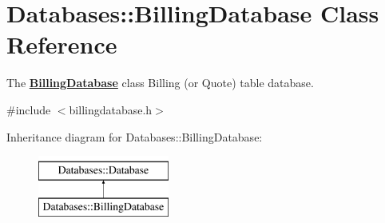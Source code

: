 \hypertarget{classDatabases_1_1BillingDatabase}{}\section{Databases\+:\+:Billing\+Database Class Reference}
\label{classDatabases_1_1BillingDatabase}


The {\bfseries \hyperlink{classDatabases_1_1BillingDatabase}{Billing\+Database}} class Billing (or Quote) table database.  




{\ttfamily \#include $<$billingdatabase.\+h$>$}

Inheritance diagram for Databases\+:\+:Billing\+Database\+:\begin{figure}[H]
\begin{center}
\leavevmode
\includegraphics[height=2.000000cm]{df/df8/classDatabases_1_1BillingDatabase}
\end{center}
\end{figure}
